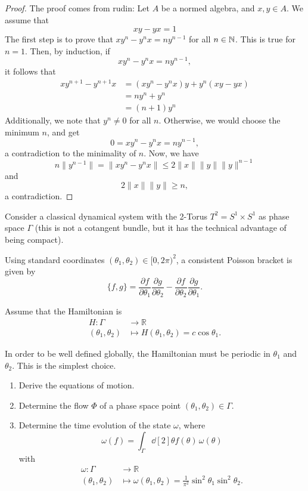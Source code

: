 \begin{proof}
	The proof comes from rudin: Let $A$ be a normed algebra, and $x,y\in A$. We assume that
	\[xy - yx = 1\]
	The first step is to prove that $xy^n - y^n x = ny^{n-1}$ for all $n\in \mathbb{N}$. This is true for $n=1$. Then, by induction, if
	\[
	xy^n - y^n x = ny^{n-1}
	,\] 
	it follows that
	\begin{align*}
		xy^{n+1} - y^{n+1}x &= (xy^n - y^n x)y + y^n (xy - yx)\\
		&= ny^n + y^n\\
		&= (n+1)y^n
	\end{align*}
	Additionally, we note that $y^n\neq 0$ for all $n$. Otherwise, we would choose the minimum $n$, and get
	\[
	0 = xy^n - y^n x = n y^{n-1}
	,\]
	a contradiction to the minimality of $n$. Now, we have
	\[
	n \|y^{n-1}\|= \|xy^n - y^n x\|\le 2 \|x\|\|y\|\|y\|^{n-1}
	\] 
	and
	\[
	2\|x\|\|y\|\ge n
	,\]
	a contradiction.
\end{proof}
\begin{Problem}

Consider a classical dynamical system with the 2-Torus $T^2 = S^1 \times S^1$ as phase space $\Gamma$ (this is not a cotangent bundle, but it has the technical advantage of being compact).

Using standard coordinates $(\theta_1, \theta_2) \in [0, 2\pi)^2$, a consistent Poisson bracket is given by
\begin{equation}
	\{f,g\} = \frac{\partial f}{\partial \theta_1} \frac{\partial g}{\partial \theta_2} - \frac{\partial f}{\partial \theta_2} \frac{\partial g}{\partial \theta_1}.
\end{equation}

Assume that the Hamiltonian is
\begin{align}
	H : \Gamma &\to \mathbb{R} \nonumber \\
	(\theta_1, \theta_2) &\mapsto H(\theta_1, \theta_2) = c\cos \theta_1.
\end{align}

In order to be well defined globally, the Hamiltonian must be periodic in $\theta_1$ and $\theta_2$. This is the simplest choice.

\begin{enumerate}
	\item Derive the equations of motion.
	\item Determine the flow $\Phi$ of a phase space point $(\theta_1, \theta_2) \in \Gamma$.
	\item Determine the time evolution of the state $\omega$, where
	\begin{equation}
		\omega(f) = \int_{\Gamma} \dd[2]{\theta}f(\theta) \, \omega(\theta)
	\end{equation}
	with
	\begin{align}
		\omega : \Gamma &\to \mathbb{R}\nonumber \\
		(\theta_1, \theta_2) &\mapsto \omega(\theta_1, \theta_2) = \frac{1}{\pi^2} \sin^2 \theta_1 \sin^2 \theta_2.
	\end{align}
\end{enumerate}
\end{Problem}
